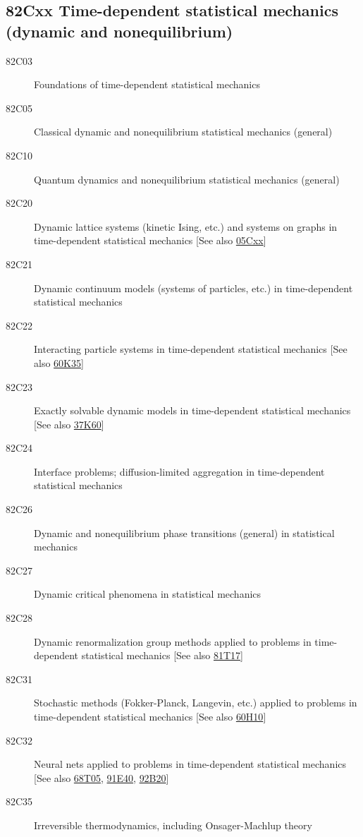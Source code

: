 \documentclass[letterpaper]{article}
\begin{document}
\subsection*{82Cxx  Time-dependent statistical mechanics (dynamic and nonequilibrium) }\label{82Cxx}
\begin{description}  
\item [82C03]\label{82C03} Foundations of time-dependent statistical mechanics
\item [82C05]\label{82C05} Classical dynamic and nonequilibrium statistical mechanics (general)
\item [82C10]\label{82C10} Quantum dynamics and nonequilibrium statistical mechanics (general)
\item [82C20]\label{82C20} Dynamic lattice systems (kinetic Ising, etc.) and systems on graphs in time-dependent statistical mechanics [See also \hyperref[05Cxx]{05Cxx}]
\item [82C21]\label{82C21} Dynamic continuum models (systems of particles, etc.) in time-dependent statistical mechanics
\item [82C22]\label{82C22} Interacting particle systems in time-dependent statistical mechanics [See also \hyperref[60K35]{60K35}]
\item [82C23]\label{82C23} Exactly solvable dynamic models in time-dependent statistical mechanics [See also \hyperref[37K60]{37K60}]
\item [82C24]\label{82C24} Interface problems; diffusion-limited aggregation in time-dependent statistical mechanics
\item [82C26]\label{82C26} Dynamic and nonequilibrium phase transitions (general) in statistical mechanics
\item [82C27]\label{82C27} Dynamic critical phenomena in statistical mechanics
\item [82C28]\label{82C28} Dynamic renormalization group methods applied to problems in time-dependent statistical mechanics [See also \hyperref[81T17]{81T17}]
\item [82C31]\label{82C31} Stochastic methods (Fokker-Planck, Langevin, etc.) applied to problems in time-dependent statistical mechanics [See also \hyperref[60H10]{60H10}]
\item [82C32]\label{82C32} Neural nets applied to problems in time-dependent statistical mechanics [See also \hyperref[68T05]{68T05}, \hyperref[91E40]{91E40}, \hyperref[92B20]{92B20}]
\item [82C35]\label{82C35} Irreversible thermodynamics, including Onsager-Machlup theory

\end{description}
\end{document}
